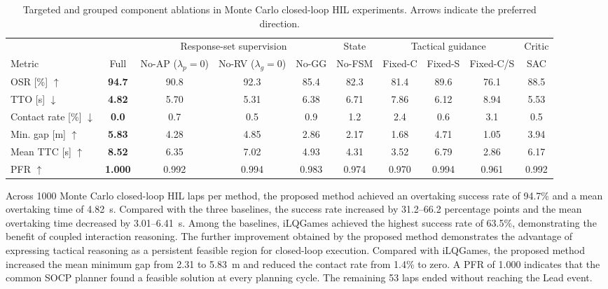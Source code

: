 \documentclass[journal,twoside,web]{ieeecolor}
\begin{document}
\begin{table}[!t]
\centering
\scriptsize
\setlength{\tabcolsep}{2.4pt}
\renewcommand{\arraystretch}{1.10}
\caption{Targeted and grouped component ablations in Monte Carlo closed-loop
HIL experiments. Arrows indicate the preferred direction.}
\label{tab:ablation}
\begin{tabular}{@{}lccccccccc@{}}
\toprule
& & \multicolumn{3}{c}{Response-set supervision}
& \multicolumn{1}{c}{State}
& \multicolumn{3}{c}{Tactical guidance}
& \multicolumn{1}{c}{Critic} \\
\cmidrule(lr){3-5}
\cmidrule(lr){6-6}
\cmidrule(lr){7-9}
\cmidrule(l){10-10}
Metric
& Full
& \shortstack{No-AP\\($\lambda_p=0$)}
& \shortstack{No-RV\\($\lambda_g=0$)}
& No-GG
& No-FSM
& Fixed-C
& Fixed-S
& Fixed-C/S
& SAC \\
\midrule
OSR [\%] $\uparrow$
& \textbf{94.7} & 90.8 & 92.3 & 85.4 & 82.3 & 81.4 & 89.6 & 76.1 & 88.5 \\
TTO [s] $\downarrow$
& \textbf{4.82} & 5.70 & 5.31 & 6.38 & 6.71 & 7.86 & 6.12 & 8.94 & 5.53 \\
Contact rate [\%] $\downarrow$
& \textbf{0.0} & 0.7 & 0.5 & 0.9 & 1.2 & 2.4 & 0.6 & 3.1 & 0.5 \\
Min. gap [m] $\uparrow$
& \textbf{5.83} & 4.28 & 4.85 & 2.86 & 2.17 & 1.68 & 4.71 & 1.05 & 3.94 \\
Mean TTC [s] $\uparrow$
& \textbf{8.52} & 6.35 & 7.02 & 4.93 & 4.31 & 3.52 & 6.79 & 2.86 & 6.17 \\
PFR $\uparrow$
& \textbf{1.000} & 0.992 & 0.994 & 0.983 & 0.974 & 0.970 & 0.994 & 0.961 & 0.992 \\
\bottomrule
\end{tabular}
\end{table}

Across 1000 Monte Carlo closed-loop HIL laps per method, the proposed method
achieved an overtaking success rate of 94.7\% and a mean overtaking time of
4.82~s. Compared with the three baselines, the success rate increased by
31.2--66.2 percentage points and the mean overtaking time decreased by
3.01--6.41~s. Among the baselines, iLQGames achieved the highest success rate
of 63.5\%, demonstrating the benefit of coupled interaction reasoning. The
further improvement obtained by the proposed method demonstrates the advantage
of expressing tactical reasoning as a persistent feasible region for
closed-loop execution. Compared with iLQGames, the proposed method increased
the mean minimum gap from 2.31 to 5.83~m and reduced the contact rate from
1.4\% to zero. A PFR of 1.000 indicates that the common SOCP planner found a
feasible solution at every planning cycle. The remaining 53 laps ended without
reaching the Lead event.
\end{document}
